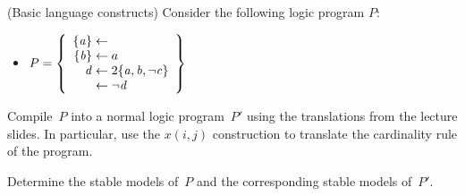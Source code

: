 \begin{Uebung}{(Basic language constructs)}%
%
Consider the following logic program $P$:
\begin{itemize}
\item[]
\(
P =
\left\{
\begin{array}{r@{{}\leftarrow{}}l}
\{ \mathit{a} \} &
\\
\{ \mathit{b} \} & a
\\
\mathit{d}      & 2 \{ \mathit{a}, \mathit{b}, \neg\mathit{c} \}
\\
& \neg\mathit{d}
\end{array}
\right\}
\)
\end{itemize}
\begin{UList}
\item
Compile~$P$ into a normal logic program~$P'$ 
using the translations from the lecture slides.
%
In particular, use the
$\mathit{x}(i,j)$ construction to translate the cardinality rule
of the program.
\item
Determine the stable models of~$P$ and the corresponding stable models of~$P'$.
\end{UList}
\end{Uebung}



